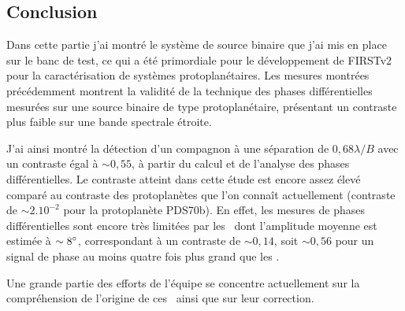\begin{figure}[ht!]
    \label{fig:PhaseDiffBin02LikeliMap}
\end{figure}


\subsection{Conclusion}

Dans cette partie j'ai montré le système de source binaire que j'ai mis en place sur le banc de test, ce qui a été primordiale pour le développement de \ac{FIRSTv2} pour la caractérisation de systèmes protoplanétaires. Les mesures montrées précédemment montrent la validité de la technique des phases différentielles mesurées sur une source binaire de type protoplanétaire, présentant un contraste plus faible sur une bande spectrale étroite.

J'ai ainsi montré la détection d'un compagnon à une séparation de $0,68 \lambda / B$ avec un contraste égal à $\sim 0,55$, à partir du calcul et de l'analyse des phases différentielles. Le contraste atteint dans cette étude est encore assez élevé comparé au contraste des protoplanètes que l'on connaît actuellement (contraste de $\sim 2.10^{-2}$ pour la protoplanète PDS70b). En effet, les mesures de phases différentielles sont encore très limitées par les \wiggles~dont l'amplitude moyenne est estimée à $\sim 8^{\circ}$, correspondant à un contraste de $\sim 0,14$, soit $\sim 0,56$ pour un signal de phase au moins quatre fois plus grand que les \wiggles.

Une grande partie des efforts de l'équipe se concentre actuellement sur la compréhension de l'origine de ces \wiggles~ainsi que sur leur correction.


